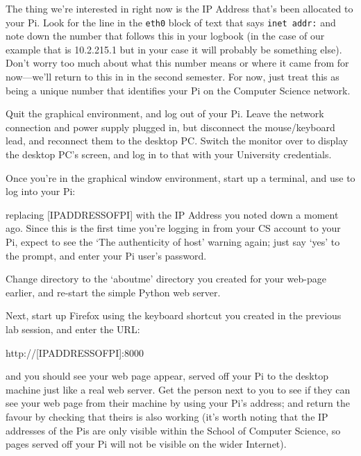 The thing we're interested in right now is the IP Address that's been allocated to your Pi. Look for the line in the \texttt{eth0} block of text that says \texttt{inet addr:} and note down the number that follows this in your logbook (in the case of our example that is 10.2.215.1 but in your case it will probably be something else). Don't worry too much about what this number means or where it came from for now---we'll return to this in  in the second semester. For now, just treat this as being a unique number that identifies your Pi on the Computer Science network. 

Quit the graphical environment, and log out of your Pi. Leave the network connection and power supply plugged in, but disconnect the mouse/keyboard lead, and reconnect them to the desktop PC. Switch the monitor over to display the desktop PC's screen, and log in to that with your University credentials. 

Once you're in the graphical window environment, start up a terminal, and use  to log into your Pi:


replacing [IPADDRESSOFPI] with the IP Address you noted down a moment ago. Since this is the first time you're logging in from your CS account to your Pi, expect to see the `The authenticity of host' warning again; just say `yes' to the prompt, and enter your Pi user's password. 

Change directory to the `aboutme' directory you created for your web-page earlier, and re-start the simple Python web server. 

Next, start up Firefox using the keyboard shortcut you created in the previous lab session, and enter the URL:

\begin{ttoutenv}
http://[IPADDRESSOFPI]:8000
\end{ttoutenv}

and you should see your web page appear, served off your Pi to the desktop machine just like a real web server. Get the person next to you to see if they can see your web page from their machine by using your Pi's address; and return the favour by checking that theirs is also working (it's worth noting that the IP addresses of the Pis are only visible within the School of Computer Science, so pages served off your Pi will not be visible on the wider Internet).


